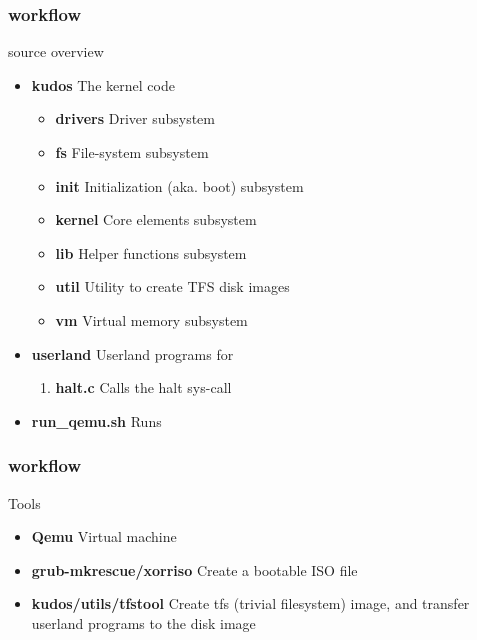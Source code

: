 \begin{frame}
    \frametitle{\kudos{} workflow}

    \begin{center}
        \kudos{} source overview
    \end{center}
    \vspace{\fill}

    \begin{itemize}
        \item \textbf{kudos} The \kudos{} kernel code
            \begin{itemize}
                \item \textbf{drivers} Driver subsystem
                \item \textbf{fs} File-system subsystem
                \item \textbf{init} Initialization (aka. boot) subsystem
                \item \textbf{kernel} Core elements subsystem
                \item \textbf{lib} Helper functions subsystem
                \item \textbf{util} Utility to create TFS disk images
                \item \textbf{vm} Virtual memory subsystem
            \end{itemize}
        \item \textbf{userland} Userland programs for \kudos{}
            \begin{enumerate}
                \item \textbf{halt.c} Calls the halt sys-call
            \end{enumerate}
        \item \textbf{run\_qemu.sh} Runs \kudos{}
    \end{itemize}

    \vspace{\fill}
\end{frame}

\begin{frame}
    \frametitle{\kudos{} workflow}

    \begin{center}
        Tools
    \end{center}
    \vspace{\fill}

    \begin{itemize}
        \item \textbf{Qemu} Virtual machine
        \item \textbf{grub-mkrescue/xorriso} Create a bootable ISO file
        \item \textbf{kudos/utils/tfstool} Create tfs (trivial filesystem) image, and transfer userland programs to the disk image
    \end{itemize}
\end{frame}

